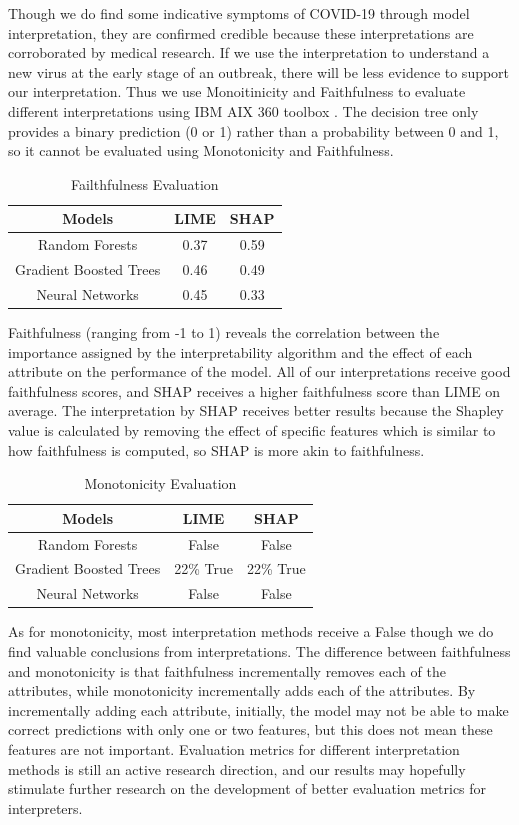 Though we do find some indicative symptoms of COVID-19 through model interpretation, they are confirmed credible because these interpretations are corroborated by medical research. If we use the interpretation to understand a new virus at the early stage of an outbreak, there will be less evidence to support our interpretation. Thus we use Monoitinicity and Faithfulness to evaluate different interpretations using IBM AIX 360 toolbox \citep{aix360-sept-2019}. The decision tree only provides a binary prediction (0 or 1) rather than a probability between 0 and 1, so it cannot be evaluated using Monotonicity and Faithfulness.

\begin{table}[H]
\centering
\begin{tabular}{@{}ccc@{}}
\toprule
Models   & LIME & SHAP \\ \midrule
Random Forests & 0.37  & 0.59      \\
Gradient Boosted Trees & 0.46 & 0.49 \\
Neural Networks & 0.45 & 0.33 \\ \bottomrule
\end{tabular}
\caption{Failthfulness Evaluation}
\end{table}

Faithfulness (ranging from -1 to 1) reveals the correlation between the importance assigned by the interpretability algorithm and the effect of each attribute on the performance of the model. All of our interpretations receive good faithfulness scores, and SHAP receives a higher faithfulness score than LIME on average. The interpretation by SHAP receives better results because the Shapley value is calculated by removing the effect of specific features which is similar to how faithfulness is computed, so SHAP is more akin to faithfulness.

\begin{table}[H]
\centering
\begin{tabular}{@{}ccc@{}}
\toprule
Models   & LIME & SHAP \\ \midrule
Random Forests & False  & False      \\
Gradient Boosted Trees & 22\% True & 22\% True \\
Neural Networks & False & False \\ \bottomrule
\end{tabular}
\caption{Monotonicity Evaluation}
\end{table}

As for monotonicity, most interpretation methods receive a False though we do find valuable conclusions from interpretations. The difference between faithfulness and monotonicity is that faithfulness incrementally removes each of the attributes, while monotonicity incrementally adds each of the attributes. By incrementally adding each attribute, initially, the model may not be able to make correct predictions with only one or two features, but this does not mean these features are not important. Evaluation metrics for different interpretation methods is still an active research direction, and our results may hopefully stimulate further research on the development of better evaluation metrics for interpreters.

